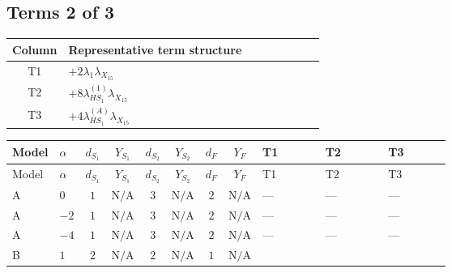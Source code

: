 \documentclass[8pt]{article}
\begin{document}
\begin{landscape}
\subsection*{Terms 2 of 3}
\begin{center}
\begin{tabular}{@{}c >{\raggedright\arraybackslash}p{0.82\linewidth}@{}}
\toprule
Column & Representative term structure \\
\midrule
T1 & \(\displaystyle +2 {\lambda_1} {\lambda_{X_{15}}}\) \\
\midrule
T2 & \(\displaystyle +8 {\lambda_{HS_1}^{(1)}} {\lambda_{X_{15}}}\) \\
\midrule
T3 & \(\displaystyle +4 {\lambda_{HS_1}^{(A)}} {\lambda_{X_{15}}}\) \\
\midrule
\bottomrule
\end{tabular}
\end{center}
\smallskip
\tiny
\begin{longtable}{@{}llcccccc >{\raggedright\arraybackslash}p{0.21\linewidth} >{\raggedright\arraybackslash}p{0.21\linewidth} >{\raggedright\arraybackslash}p{0.21\linewidth}@{}}
\toprule
Model & $\alpha$ & $d_{S_1}$ & $Y_{S_1}$ & $d_{S_2}$ & $Y_{S_2}$ & $d_F$ & $Y_F$ & T1 & T2 & T3 \\
\midrule
\endfirsthead
\toprule
Model & $\alpha$ & $d_{S_1}$ & $Y_{S_1}$ & $d_{S_2}$ & $Y_{S_2}$ & $d_F$ & $Y_F$ & T1 & T2 & T3 \\
\midrule
\endhead
A & $0$ & $1$ & $\text{N/A}$ & $3$ & $\text{N/A}$ & $2$ & $\text{N/A}$ & --- & --- & --- \\
\midrule
A & $-2$ & $1$ & $\text{N/A}$ & $3$ & $\text{N/A}$ & $2$ & $\text{N/A}$ & --- & --- & --- \\
\midrule
A & $-4$ & $1$ & $\text{N/A}$ & $3$ & $\text{N/A}$ & $2$ & $\text{N/A}$ & --- & --- & --- \\
\midrule
B & $1$ & $2$ & $\text{N/A}$ & $2$ & $\text{N/A}$ & $1$ & $\text{N/A}$ & \scriptsize\adjustbox{max width=\linewidth}{$\begin{gathered} +2 {\lambda_1} {\lambda_{X_{15}}}\end{gathered}$} & \scriptsize\adjustbox{max width=\linewidth}{$\begin{gathered} +8 {\lambda_{HS_1}^{(1)}} {\lambda_{X_{15}}}\end{gathered}$} & \scriptsize\adjustbox{max width=\linewidth}{$\begin{gathered} +4 {\lambda_{HS_1}^{(A)}} {\lambda_{X_{15}}}\end{gathered}$} \\

\end{longtable}
\end{landscape}
\end{document}
